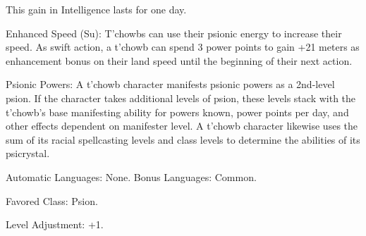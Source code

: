 \begin{itemize*}
    This gain in Intelligence lasts for one day.

    \item Enhanced Speed (Su): T'chowbs can use their psionic energy to increase their speed. As swift action, a t'chowb can spend 3 power points to gain +21 meters as enhancement bonus on their land speed until the beginning of their next action.

    \item Psionic Powers: A t'chowb character manifests psionic powers as a 2nd-level psion. If the character takes additional levels of psion, these levels stack with the t'chowb's base manifesting ability for powers known, power points per day, and other effects dependent on manifester level. A t'chowb character likewise uses the sum of its racial spellcasting levels and class levels to determine the abilities of its psicrystal.

    \item Automatic Languages: None. Bonus Languages: Common.
    \item Favored Class: Psion.
    \item Level Adjustment: +1.
\end{itemize*}
